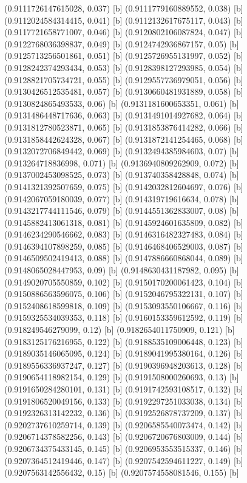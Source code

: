 {{{(0.9111726147615028, 0.037) [b] 
(0.9111779160889552, 0.038) [b] 
(0.9112024584314415, 0.041) [b] 
(0.9112132617675117, 0.043) [b] 
(0.9117721658771007, 0.046) [b] 
(0.9120802106087824, 0.047) [b] 
(0.9122768036398837, 0.049) [b] 
(0.9124742936867157, 0.05) [b] 
(0.9125713256501861, 0.051) [b] 
(0.9125726955131997, 0.052) [b] 
(0.9128242374293434, 0.053) [b] 
(0.9128398127293985, 0.054) [b] 
(0.9128821705734721, 0.055) [b] 
(0.9129557736979051, 0.056) [b] 
(0.9130426512535481, 0.057) [b] 
(0.9130660481931889, 0.058) [b] 
(0.9130824865493533, 0.06) [b] 
(0.9131181600653351, 0.061) [b] 
(0.9131486448717636, 0.063) [b] 
(0.9131491014927682, 0.064) [b] 
(0.9131812780523871, 0.065) [b] 
(0.9131853876414282, 0.066) [b] 
(0.9131858442624328, 0.067) [b] 
(0.9131872141254465, 0.068) [b] 
(0.9132072706849442, 0.069) [b] 
(0.9132494385984603, 0.07) [b] 
(0.913264718836998, 0.071) [b] 
(0.9136940809262909, 0.072) [b] 
(0.9137002453098525, 0.073) [b] 
(0.913740358428848, 0.074) [b] 
(0.9141321392507659, 0.075) [b] 
(0.9142032812604697, 0.076) [b] 
(0.9142067059180039, 0.077) [b] 
(0.914319719616634, 0.078) [b] 
(0.9143217744111546, 0.079) [b] 
(0.9144551362833007, 0.08) [b] 
(0.9145882413061318, 0.081) [b] 
(0.9145924601635809, 0.082) [b] 
(0.9146234290546662, 0.083) [b] 
(0.9146316482327483, 0.084) [b] 
(0.9146394107898259, 0.085) [b] 
(0.9146468406529003, 0.087) [b] 
(0.9146509502419413, 0.088) [b] 
(0.9147886660868044, 0.089) [b] 
(0.9148065028447953, 0.09) [b] 
(0.9148630431187982, 0.095) [b] 
(0.9149020705550859, 0.102) [b] 
(0.9150170200061423, 0.104) [b] 
(0.9150886563596075, 0.106) [b] 
(0.9152046795322131, 0.107) [b] 
(0.9152408618599818, 0.109) [b] 
(0.9153093550106667, 0.116) [b] 
(0.9159325534039353, 0.118) [b] 
(0.9160153359612592, 0.119) [b] 
(0.918249546279099, 0.12) [b] 
(0.9182654011750909, 0.121) [b] 
(0.9183125176216955, 0.122) [b] 
(0.9188535109006448, 0.123) [b] 
(0.9189035146065095, 0.124) [b] 
(0.9189041995380164, 0.126) [b] 
(0.9189556336937247, 0.127) [b] 
(0.9190396948203613, 0.128) [b] 
(0.9190654118982154, 0.129) [b] 
(0.9191508000260693, 0.13) [b] 
(0.9191650284280101, 0.131) [b] 
(0.9191742593108517, 0.132) [b] 
(0.9191806520049156, 0.133) [b] 
(0.9192297251033038, 0.134) [b] 
(0.9192326313142232, 0.136) [b] 
(0.9192526878737209, 0.137) [b] 
(0.9202737610259714, 0.139) [b] 
(0.9206585540073474, 0.142) [b] 
(0.9206714378582256, 0.143) [b] 
(0.9206720676803009, 0.144) [b] 
(0.9206734375433145, 0.145) [b] 
(0.9206953553515337, 0.146) [b] 
(0.9207364512419446, 0.147) [b] 
(0.9207542594611227, 0.149) [b] 
(0.9207563142556432, 0.15) [b] 
(0.9207574558081546, 0.155) [b] 
}}}
